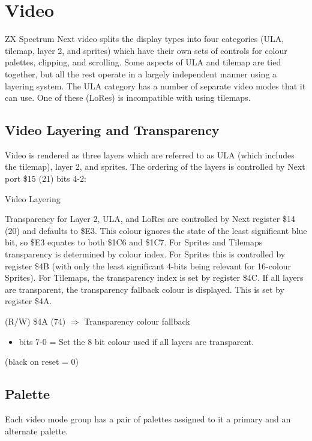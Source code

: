 \chapter{Video}

ZX Spectrum Next video splits the display types into four categories
(ULA, tilemap, layer 2, and sprites) which have their own sets of
controls for colour palettes, clipping, and scrolling. Some aspects of
ULA and tilemap are tied together, but all the rest operate in a
largely independent manner using a layering system. The ULA category
has a number of separate video modes that it can use. One of these
(LoRes) is incompatible with using tilemaps.

\section{Video Layering and Transparency}
Video is rendered as three layers which are referred to as ULA (which
includes the tilemap), layer 2, and sprites.  The ordering of the
layers is controlled by Next port \$15 (21) bits 4-2:

\begin{table}[h]\centering
  \caption{Video Layering}
\end{table}

Transparency for Layer 2, ULA, and LoRes are controlled by Next
register \$14 (20) and defaults to \$E3. This colour ignores the state
of the least significant blue bit, so \$E3 equates to both \$1C6 and
\$1C7. For Sprites and Tilemaps transparency is determined by colour
index. For Sprites this is controlled by register \$4B (with only the
least significant 4-bits being relevant for 16-colour Sprites). For
Tilemaps, the transparency index is set by register \$4C. If all
layers are transparent, the transparency fallback colour is
displayed. This is set by register \$4A.

(R/W) \$4A (74) $\Rightarrow$ Transparency colour fallback
\begin{itemize}
\item[] bits 7-0 = Set the 8 bit colour used if all layers are transparent.
\end{itemize}
(black on reset = 0)

\section{Palette}
Each video mode group has a pair of palettes assigned to it a primary
and an alternate palette.

